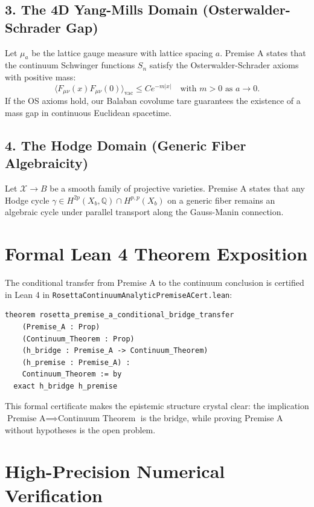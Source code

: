 \documentclass[11pt,a4paper]{article}
\theoremstyle{definition}
\begin{document}
\subsection{3. The 4D Yang-Mills Domain (Osterwalder-Schrader Gap)}
Let $\mu_a$ be the lattice gauge measure with lattice spacing $a$. Premise A states that the continuum Schwinger functions $S_n$ satisfy the Osterwalder-Schrader axioms with positive mass:
\begin{equation}
\langle F_{\mu\nu}(x) F_{\mu\nu}(0) \rangle_{\mathrm{vac}} \le C e^{-m |x|} \quad \text{with } m > 0 \text{ as } a \to 0.
\end{equation}
If the OS axioms hold, our Balaban covolume tare guarantees the existence of a mass gap in continuous Euclidean spacetime.

\subsection{4. The Hodge Domain (Generic Fiber Algebraicity)}
Let $\mathcal{X} \to B$ be a smooth family of projective varieties. Premise A states that any Hodge cycle $\gamma \in H^{2p}(X_b, \mathbb{Q}) \cap H^{p,p}(X_b)$ on a generic fiber remains an algebraic cycle under parallel transport along the Gauss-Manin connection.


\section{Formal Lean 4 Theorem Exposition}

The conditional transfer from Premise A to the continuum conclusion is certified in Lean 4 in \texttt{RosettaContinuumAnalyticPremiseACert.lean}:

\begin{lstlisting}[language=Lean4]
theorem rosetta_premise_a_conditional_bridge_transfer
    (Premise_A : Prop)
    (Continuum_Theorem : Prop)
    (h_bridge : Premise_A -> Continuum_Theorem)
    (h_premise : Premise_A) :
    Continuum_Theorem := by
  exact h_bridge h_premise
\end{lstlisting}

This formal certificate makes the epistemic structure crystal clear: the implication $\text{Premise A} \implies \text{Continuum Theorem}$ is the bridge, while proving Premise A without hypotheses is the open problem.


\section{High-Precision Numerical Verification}
\end{document}
